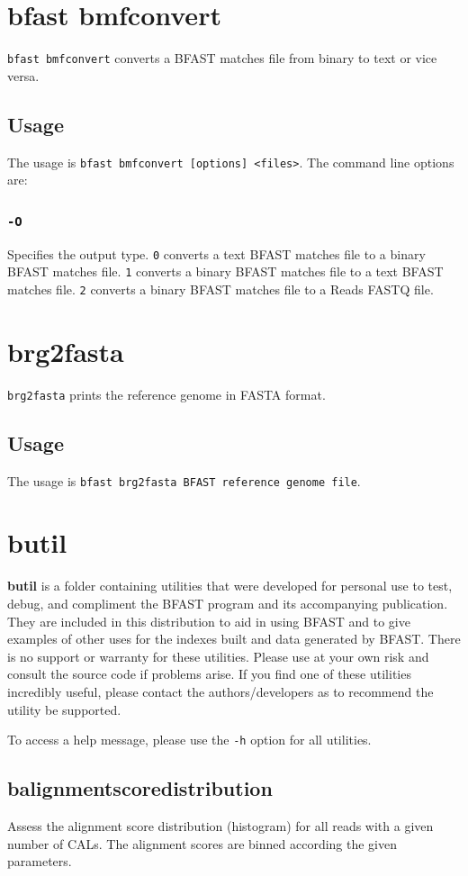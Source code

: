 \documentclass[a4paper,12pt]{book}
\newcommand{\TT}[1]{{\tt #1}} %
\newcommand{\BF}[1]{{\bf #1}} %
\newcommand{\RFF}{Reads FASTQ file}
\newcommand{\BRGF}{BFAST reference genome file} %
\newcommand{\BMF}{BFAST matches file} %
\begin{document}
\section{bfast bmfconvert}
\label{sec:bmfconvert}
\TT{bfast bmfconvert} converts a \BMF{} from binary to text or vice versa.
\subsection{Usage}
The usage is \TT{bfast bmfconvert [options] <files>}.
The command line options are:
\subsubsection{\TT{-O}}
Specifies the output type.
\TT{0} converts a text \BMF{} to a binary \BMF{}.
\TT{1} converts a binary \BMF{} to a text \BMF{}.
\TT{2} converts a binary \BMF{} to a \RFF{}.

\section{brg2fasta}
\label{sec:brg2fasta}
\TT{brg2fasta} prints the reference genome in FASTA format.
\subsection{Usage}
The usage is \TT{bfast brg2fasta \BRGF{}}.
\section{butil}
\label{sec:butil}
\BF{butil} is a folder containing utilities that were developed for personal use to test, debug, and compliment the BFAST program and its accompanying publication.  
They are included in this distribution to aid in using BFAST and to give examples of other uses for the indexes built and data generated by BFAST.
There is no support or warranty for these utilities.  
Please use at your own risk and consult the source code if problems arise.  
If you find one of these utilities incredibly useful, please contact the authors/developers as to recommend the utility be supported.

To access a help message, please use the \TT{-h} option for all utilities.

\subsection{balignmentscoredistribution}
\label{sec:balignmentscoredistribution}
Assess the alignment score distribution (histogram) for all reads with a given number of CALs.
The alignment scores are binned according the given parameters.
\end{document}
